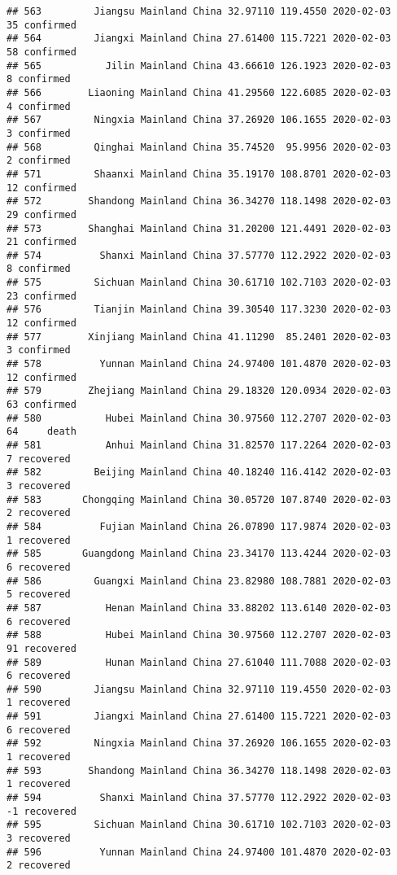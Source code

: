 \documentclass[
]{article}
\begin{document}
\begin{verbatim}
## 563         Jiangsu Mainland China 32.97110 119.4550 2020-02-03    35 confirmed
## 564         Jiangxi Mainland China 27.61400 115.7221 2020-02-03    58 confirmed
## 565           Jilin Mainland China 43.66610 126.1923 2020-02-03     8 confirmed
## 566        Liaoning Mainland China 41.29560 122.6085 2020-02-03     4 confirmed
## 567         Ningxia Mainland China 37.26920 106.1655 2020-02-03     3 confirmed
## 568         Qinghai Mainland China 35.74520  95.9956 2020-02-03     2 confirmed
## 571         Shaanxi Mainland China 35.19170 108.8701 2020-02-03    12 confirmed
## 572        Shandong Mainland China 36.34270 118.1498 2020-02-03    29 confirmed
## 573        Shanghai Mainland China 31.20200 121.4491 2020-02-03    21 confirmed
## 574          Shanxi Mainland China 37.57770 112.2922 2020-02-03     8 confirmed
## 575         Sichuan Mainland China 30.61710 102.7103 2020-02-03    23 confirmed
## 576         Tianjin Mainland China 39.30540 117.3230 2020-02-03    12 confirmed
## 577        Xinjiang Mainland China 41.11290  85.2401 2020-02-03     3 confirmed
## 578          Yunnan Mainland China 24.97400 101.4870 2020-02-03    12 confirmed
## 579        Zhejiang Mainland China 29.18320 120.0934 2020-02-03    63 confirmed
## 580           Hubei Mainland China 30.97560 112.2707 2020-02-03    64     death
## 581           Anhui Mainland China 31.82570 117.2264 2020-02-03     7 recovered
## 582         Beijing Mainland China 40.18240 116.4142 2020-02-03     3 recovered
## 583       Chongqing Mainland China 30.05720 107.8740 2020-02-03     2 recovered
## 584          Fujian Mainland China 26.07890 117.9874 2020-02-03     1 recovered
## 585       Guangdong Mainland China 23.34170 113.4244 2020-02-03     6 recovered
## 586         Guangxi Mainland China 23.82980 108.7881 2020-02-03     5 recovered
## 587           Henan Mainland China 33.88202 113.6140 2020-02-03     6 recovered
## 588           Hubei Mainland China 30.97560 112.2707 2020-02-03    91 recovered
## 589           Hunan Mainland China 27.61040 111.7088 2020-02-03     6 recovered
## 590         Jiangsu Mainland China 32.97110 119.4550 2020-02-03     1 recovered
## 591         Jiangxi Mainland China 27.61400 115.7221 2020-02-03     6 recovered
## 592         Ningxia Mainland China 37.26920 106.1655 2020-02-03     1 recovered
## 593        Shandong Mainland China 36.34270 118.1498 2020-02-03     1 recovered
## 594          Shanxi Mainland China 37.57770 112.2922 2020-02-03    -1 recovered
## 595         Sichuan Mainland China 30.61710 102.7103 2020-02-03     3 recovered
## 596          Yunnan Mainland China 24.97400 101.4870 2020-02-03     2 recovered

\end{verbatim}
\end{document}
